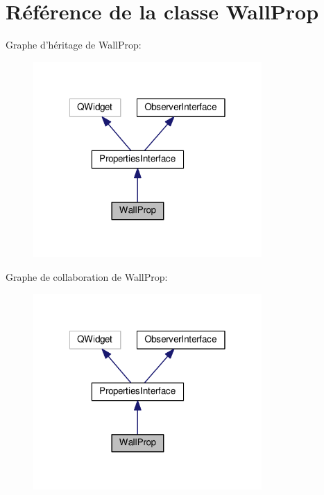 \hypertarget{classWallProp}{\section{Référence de la classe Wall\+Prop}
\label{classWallProp}
}


Graphe d'héritage de Wall\+Prop\+:
\nopagebreak
\begin{figure}[H]
\begin{center}
\leavevmode
\includegraphics[width=247pt]{dd/d41/classWallProp__inherit__graph}
\end{center}
\end{figure}


Graphe de collaboration de Wall\+Prop\+:
\nopagebreak
\begin{figure}[H]
\begin{center}
\leavevmode
\includegraphics[width=247pt]{da/dd5/classWallProp__coll__graph}
\end{center}
\end{figure}
